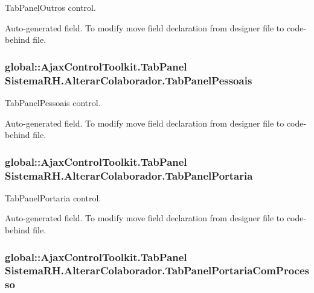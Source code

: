 TabPanelOutros control. 

Auto-\/generated field. To modify move field declaration from designer file to code-\/behind file. \hypertarget{class_sistema_r_h_1_1_alterar_colaborador_aa49d17a04b906c6a8e4b777f5c8d4287}{
\subsubsection[{TabPanelPessoais}]{\setlength{\rightskip}{0pt plus 5cm}global::AjaxControlToolkit.TabPanel {\bf SistemaRH.AlterarColaborador.TabPanelPessoais}}}
\label{class_sistema_r_h_1_1_alterar_colaborador_aa49d17a04b906c6a8e4b777f5c8d4287}


TabPanelPessoais control. 

Auto-\/generated field. To modify move field declaration from designer file to code-\/behind file. \hypertarget{class_sistema_r_h_1_1_alterar_colaborador_a790090b0ba9c06fe12914ee681302203}{
\subsubsection[{TabPanelPortaria}]{\setlength{\rightskip}{0pt plus 5cm}global::AjaxControlToolkit.TabPanel {\bf SistemaRH.AlterarColaborador.TabPanelPortaria}}}
\label{class_sistema_r_h_1_1_alterar_colaborador_a790090b0ba9c06fe12914ee681302203}


TabPanelPortaria control. 

Auto-\/generated field. To modify move field declaration from designer file to code-\/behind file. \hypertarget{class_sistema_r_h_1_1_alterar_colaborador_ab1aaaddea57b01c1fb5ed804fb7d1dd4}{
\subsubsection[{TabPanelPortariaComProcesso}]{\setlength{\rightskip}{0pt plus 5cm}global::AjaxControlToolkit.TabPanel {\bf SistemaRH.AlterarColaborador.TabPanelPortariaComProcesso}}}
\label{class_sistema_r_h_1_1_alterar_colaborador_ab1aaaddea57b01c1fb5ed804fb7d1dd4}


